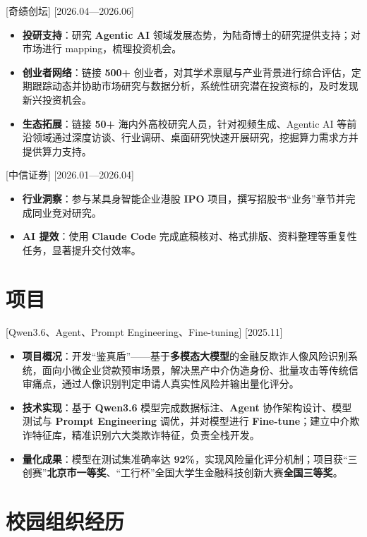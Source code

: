 \documentclass{resume}
\begin{document}
[奇绩创坛]
[2026.04—2026.06]
\begin{itemize}
  \item \textbf{投研支持}：研究 \textbf{Agentic AI} 领域发展态势，为陆奇博士的研究提供支持；对市场进行 mapping，梳理投资机会。
  \item \textbf{创业者网络}：链接 \textbf{500+} 创业者，对其学术禀赋与产业背景进行综合评估，定期跟踪动态并协助市场研究与数据分析，系统性研究潜在投资标的，及时发现新兴投资机会。
  \item \textbf{生态拓展}：链接 \textbf{50+} 海内外高校研究人员，针对视频生成、Agentic AI 等前沿领域通过深度访谈、行业调研、桌面研究快速开展研究，挖掘算力需求方并提供算力支持。
\end{itemize}

[中信证券]
[2026.01—2026.04]
\begin{itemize}
  \item \textbf{行业洞察}：参与某具身智能企业港股 \textbf{IPO} 项目，撰写招股书“业务”章节并完成同业竞对研究。
  \item \textbf{AI 提效}：使用 \textbf{Claude Code} 完成底稿核对、格式排版、资料整理等重复性任务，显著提升交付效率。
\end{itemize}

\section{项目}

[Qwen3.6、Agent、Prompt Engineering、Fine-tuning]
[2025.11]
\begin{itemize}
  \item \textbf{项目概况}：开发“鉴真盾”——基于\textbf{多模态大模型}的金融反欺诈人像风险识别系统，面向小微企业贷款预审场景，解决黑产中介伪造身份、批量攻击等传统信审痛点，通过人像识别判定申请人真实性风险并输出量化评分。
  \item \textbf{技术实现}：基于 \textbf{Qwen3.6} 模型完成数据标注、\textbf{Agent} 协作架构设计、模型测试与 \textbf{Prompt Engineering} 调优，并对模型进行 \textbf{Fine-tune}；建立中介欺诈特征库，精准识别六大类欺诈特征，负责全栈开发。
  \item \textbf{量化成果}：模型在测试集准确率达 \textbf{92\%}，实现风险量化评分机制；项目获“三创赛”\textbf{北京市一等奖}、“工行杯”全国大学生金融科技创新大赛\textbf{全国三等奖}。
\end{itemize}

\section{校园组织经历}
\end{document}
